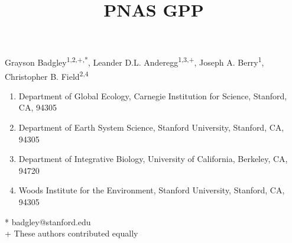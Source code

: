 \documentclass[10pt,letterpaper]{article}
\title{PNAS GPP}
\begin{document}
\vspace*{0.35in}

\begin{flushleft}
{\Large
\textbf{}
}
\newline

Grayson Badgley\textsuperscript{1,2,+,*},
Leander D.L. Anderegg\textsuperscript{1,3,+},
Joseph A. Berry\textsuperscript{1},
Christopher B. Field\textsuperscript{2,4}
\\ %

\bigskip
\small
\begin{enumerate}[itemsep=-1mm]
\item Department of Global Ecology, Carnegie Institution for Science, Stanford, CA, 94305
\item Department of Earth System Science, Stanford University, Stanford, CA, 94305
\item Department of Integrative Biology, University of California, Berkeley, CA, 94720
\item Woods Institute for the Environment, Stanford University, Stanford, CA, 94305
\end{enumerate}
\bigskip
* badgley@stanford.edu\\
+ These authors contributed equally
\end{flushleft}
\normalsize
\linenumbers
\end{document}
